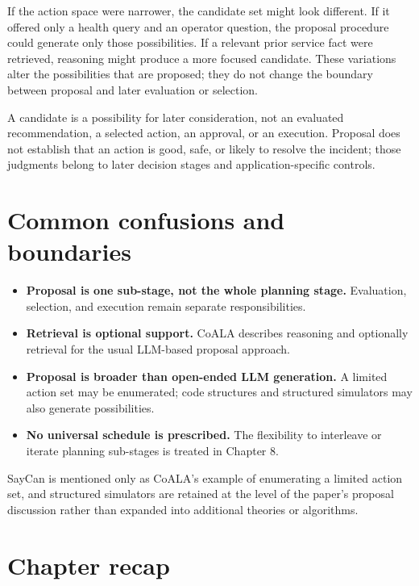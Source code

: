 If the action space were narrower, the candidate set might look different. If it offered only a health query and an operator question, the proposal procedure could generate only those possibilities. If a relevant prior service fact were retrieved, reasoning might produce a more focused candidate. These variations alter the possibilities that are proposed; they do not change the boundary between proposal and later evaluation or selection.

\begin{warningbox}
A candidate is a possibility for later consideration, not an evaluated recommendation, a selected action, an approval, or an execution. Proposal does not establish that an action is good, safe, or likely to resolve the incident; those judgments belong to later decision stages and application-specific controls.
\end{warningbox}

\section{Common confusions and boundaries}
\label{sec:proposal-boundaries}

\begin{itemize}
  \item \textbf{Proposal is one sub-stage, not the whole planning stage.} Evaluation, selection, and execution remain separate responsibilities.
  \item \textbf{Retrieval is optional support.} CoALA describes reasoning and optionally retrieval for the usual LLM-based proposal approach.
  \item \textbf{Proposal is broader than open-ended LLM generation.} A limited action set may be enumerated; code structures and structured simulators may also generate possibilities.
  \item \textbf{No universal schedule is prescribed.} The flexibility to interleave or iterate planning sub-stages is treated in Chapter 8.
\end{itemize}

SayCan is mentioned only as CoALA's example of enumerating a limited action set, and structured simulators are retained at the level of the paper's proposal discussion rather than expanded into additional theories or algorithms.

\section{Chapter recap}
\label{sec:proposal-recap}

